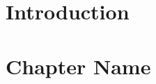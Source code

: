 \documentclass[notitlepage]{report}
\begin{document}
  \createintro
  \newpage

  \setcounter{chapter}{-1}
  \chapter{Introduction}

  

  \newpage
  \setcounter{page}{1}

  \chapter{Chapter Name}

\end{document}

